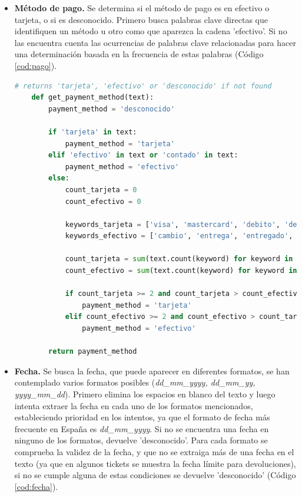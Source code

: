 \begin{itemize}
    \item \textbf{Método de pago.} Se determina si el método de pago es en efectivo o tarjeta, o si es desconocido. Primero busca palabras clave directas que identifiquen un método u otro como que aparezca la cadena 'efectivo'. Si no las encuentra cuenta las ocurrencias de palabras clave relacionadas para hacer una determinación basada en la frecuencia de estas palabras (Código \ref{cod:pago}).
    
    \begin{lstlisting}[language=Python, caption=Extracción del método de pago en un ticket, label=cod:pago]
    # returns 'tarjeta', 'efectivo' or 'desconocido' if not found
    def get_payment_method(text):
        payment_method = 'desconocido'
    
        if 'tarjeta' in text:
            payment_method = 'tarjeta'
        elif 'efectivo' in text or 'contado' in text:
            payment_method = 'efectivo'
        else:
            count_tarjeta = 0
            count_efectivo = 0
    
            keywords_tarjeta = ['visa', 'mastercard', 'debito', 'debit', 'credito', 'credit', 'contactless', 'nfc', 'cuenta','caixabank', 'bbva', 'trj', 'jeta', 'tarj', 'tanjeta']
            keywords_efectivo = ['cambio', 'entrega', 'entregado', 'efect', 'entr', 'cont']
    
            count_tarjeta = sum(text.count(keyword) for keyword in keywords_tarjeta)
            count_efectivo = sum(text.count(keyword) for keyword in keywords_efectivo)
    
            if count_tarjeta >= 2 and count_tarjeta > count_efectivo:
                payment_method = 'tarjeta'
            elif count_efectivo >= 2 and count_efectivo > count_tarjeta:
                payment_method = 'efectivo'
                
        return payment_method
    \end{lstlisting}

    \item \textbf{Fecha.} Se busca la fecha, que puede aparecer en diferentes formatos, se han contemplado varios formatos posibles (\textit{dd\_mm\_yyyy, dd\_mm\_yy, yyyy\_mm\_dd}). Primero elimina los espacios en blanco del texto y luego intenta extraer la fecha en cada uno de los formatos mencionados, estableciendo prioridad en los intentos, ya que el formato de fecha más frecuente en España es \textit{dd\_mm\_yyyy}. Si no se encuentra una fecha en ninguno de los formatos, devuelve 'desconocido'. Para cada formato se comprueba la validez de la fecha, y que no se extraiga más de una fecha en el texto (ya que en algunos tickets se muestra la fecha límite para devoluciones), si no se cumple alguna de estas condiciones se devuelve 'desconocido' (Código \ref{cod:fecha}).


\end{itemize}
